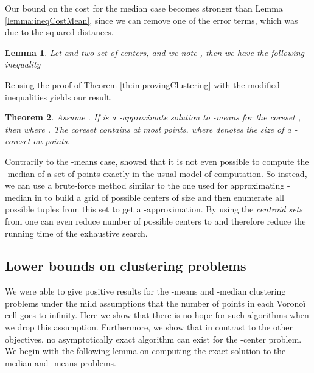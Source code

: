 \documentclass[a4paper,11pt,oneside,english,onecolumn]{article}
\newtheorem{theorem}{Theorem}
\newtheorem{lemma}[theorem]{Lemma}
\theoremstyle{definition}
\begin{document}
Our bound on the cost for the median case becomes stronger than Lemma \ref{lemma:ineqCostMean}, since we can remove one of the error terms, which was due to the squared distances.
\begin{lemma}
Let  and  two set of centers, and we note , then we have the following inequality 
\end{lemma}
Reusing the proof of Theorem \ref{th:improvingClustering} with the modified inequalities yields our result.

\begin{theorem}
Assume . If  is a -approximate solution to -means for the coreset , then 
where . The coreset  contains at most  points, where  denotes the size of a -coreset on  points.
\end{theorem}

Contrarily to the -means case, \cite{Bajaj} showed that it is not even possible to compute the -median of a set of points exactly in the usual model of computation. So instead, we can use a brute-force method similar to the one used for approximating -median in \cite{oneMedian} to build a grid of possible centers of size  and then enumerate all possible  tuples from this set to get a -approximation. By using the \emph{centroid sets} from \cite{HPClustering} one can even reduce number of possible centers to  and therefore reduce the running time of the exhaustive search.



\subsection{Lower bounds on clustering problems}
\label{section:negativeClustering}
We were able to give positive results for the -means and -median clustering problems under the mild assumptions that the number of points in each Vorono\"i cell goes to infinity. Here we show that there is no hope for such algorithms when we drop this assumption. Furthermore, we show that in contrast to the other objectives, no asymptotically exact algorithm can exist for the -center problem. We begin with the following lemma on computing the exact solution to the -median and -means problems.
\end{document}
